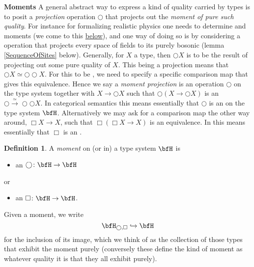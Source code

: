 \documentclass[12pt,titlepage]{article}
\theoremstyle{plain}
\theoremstyle{definition}
\newtheorem{defn}{Definition}
\theoremstyle{remark}
\begin{document}
\textbf{Moments}
A general abstract way to express a kind of quality carried by types is to posit a \emph{projection} operation $\bigcirc$ that projects out the \emph{moment of pure such quality}.
For instance for formalizing realistic physics one needs to determine  and  moments (we come to this \hyperlink{Externalization}{below}), and one way of doing so is by considering a  operation that projects every space of fields to its purely bosonic  (lemma \ref{SequenceOfSites} below).
Generally, for $X$ a type, then $\bigcirc X$ is to be the result of projecting out some pure quality of $X$. This being a projection means that $\bigcirc X  \simeq \bigcirc \bigcirc X$. For this to be , we need to specify a specific comparison map that gives this equivalence. Hence we say a \emph{moment projection} is an operation $\bigcirc$ on the type system together with  $X \to \bigcirc X$ such that $\bigcirc(X \to \bigcirc X)$ is an  $\bigcirc \stackrel{\simeq}{\longrightarrow} \bigcirc \bigcirc X$.
In categorical semantics this means essentially that $\bigcirc$ is an  on the type system $\bfH$.
Alternatively we may ask for a comparison map the other way around, $\Box X \longrightarrow X$, such that $\Box(\Box X \longrightarrow X)$ is an equivalence. In  this means essentially that $\Box$ is an .
\begin{defn}
\label{Moments}\hypertarget{Moments}{}
A \emph{moment} on (or in) a type system $\bfH$ is
\begin{itemize}%
\item an  $\bigcirc \colon \bfH \to \bfH$
\end{itemize}
or
\begin{itemize}%
\item an  $\Box \colon \bfH \to \bfH$.
\end{itemize}
Given a moment, we write
\begin{displaymath}
\bfH_{\bigcirc, \Box} \hookrightarrow \bfH
\end{displaymath}
for the inclusion of its image, which we think of as the collection of those types that exhibit the moment purely (conversely these define the kind of moment as whatever quality it is that they all exhibit purely).
\end{defn}
\end{document}
